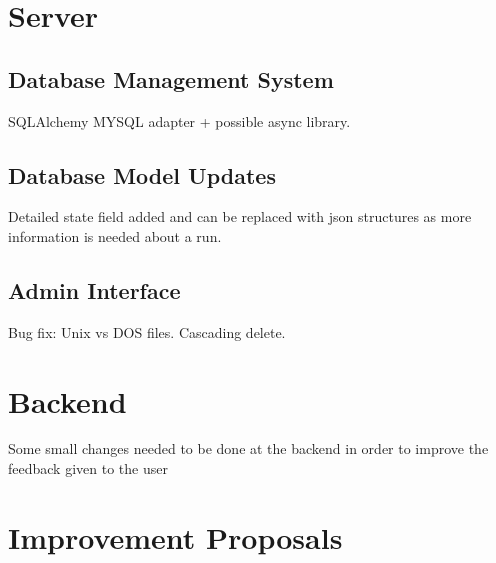 \section{Server}

\subsection{Database Management System}
SQLAlchemy MYSQL adapter + possible async library.

\subsection{Database Model Updates}
Detailed state field added and can be replaced with json structures as more information is needed about a run.

\subsection{Admin Interface}
Bug fix: Unix vs DOS files.
Cascading delete.

\section{Backend}
Some small changes needed to be done at the backend in order to improve the feedback given to the user


\section{Improvement Proposals}

